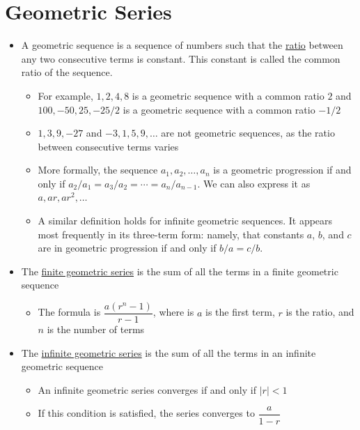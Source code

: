 \documentclass[11pt,letterpaper]{article}
\begin{document}
\begin{minipage}{\textwidth}
     \section*{Geometric Series}
     \begin{itemize}
          \item A geometric sequence is a sequence of numbers such that the \underline{ratio} between any two consecutive terms is constant. This constant is called the common ratio of the sequence.
          \begin{itemize}
               \item For example, $1, 2, 4, 8$ is a geometric sequence with a common ratio $2$ and $100, -50, 25, -25/2$ is a geometric sequence with a common ratio $-1/2$
               \item $1, 3, 9, -27$ and $-3, 1, 5, 9, \ldots$ are not geometric sequences, as the ratio between consecutive terms varies
               \item More formally, the sequence $a_1, a_2, \ldots , a_n$ is a geometric progression if and only if $a_2 / a_1 = a_3 / a_2 = \cdots = a_n / a_{n-1}$. We can also express it as $a, ar, ar^2, \ldots$
               \item A similar definition holds for infinite geometric sequences. It appears most frequently in its three-term form: namely, that constants $a$, $b$, and $c$ are in geometric progression if and only if $b / a = c / b$.
          \end{itemize}
          \item The \underline{finite geometric series} is the sum of all the terms in a finite geometric sequence
          \begin{itemize}
               \item The formula is $\dfrac{a(r^n-1)}{r-1}$, where is $a$ is the first term, $r$ is the ratio, and $n$ is the number of terms 
          \end{itemize}
          \item The \underline{infinite geometric series} is the sum of all the terms in an infinite geometric sequence
          \begin{itemize}
               \item An infinite geometric series converges if and only if $|r|<1$
               \item If this condition is satisfied, the series converges to $\dfrac{a}{1-r}$
          \end{itemize}
     \end{itemize}
     \vspace{3em}
\end{minipage}
\end{document}

